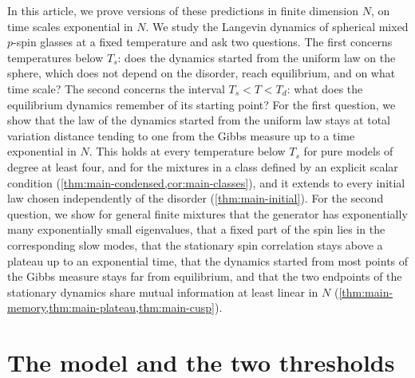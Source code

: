 In this article, we prove versions of these predictions in finite dimension $N$, on time scales exponential in $N$. We study the Langevin dynamics of spherical mixed $p$-spin glasses at a fixed temperature and ask two questions. The first concerns temperatures below $T_s$: does the dynamics started from the uniform law on the sphere, which does not depend on the disorder, reach equilibrium, and on what time scale? The second concerns the interval $T_s<T<T_d$: what does the equilibrium dynamics remember of its starting point? For the first question, we show that the law of the dynamics started from the uniform law stays at total variation distance tending to one from the Gibbs measure up to a time exponential in $N$. This holds at every temperature below $T_s$ for pure models of degree at least four, and for the mixtures in a class defined by an explicit scalar condition (\cref{thm:main-condensed,cor:main-classes}), and it extends to every initial law chosen independently of the disorder (\cref{thm:main-initial}). For the second question, we show for general finite mixtures that the generator has exponentially many exponentially small eigenvalues, that a fixed part of the spin lies in the corresponding slow modes, that the stationary spin correlation stays above a plateau up to an exponential time, that the dynamics started from most points of the Gibbs measure stays far from equilibrium, and that the two endpoints of the stationary dynamics share mutual information at least linear in $N$ (\cref{thm:main-memory,thm:main-plateau,thm:main-cusp}).

\section{The model and the two thresholds}\label{sec:intro-model}

